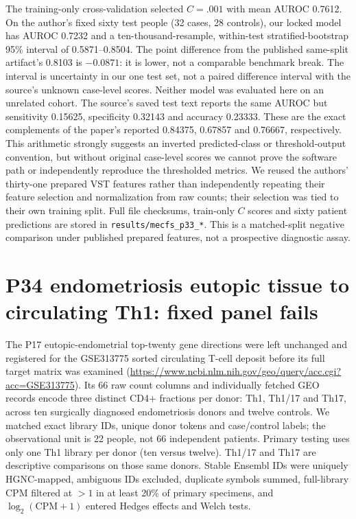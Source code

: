 \documentclass[11pt,a4paper]{article}
\begin{document}
The training-only cross-validation selected $C=.001$ with mean AUROC 0.7612. On the author's fixed sixty test people (32 cases, 28 controls), our locked model has AUROC 0.7232 and a ten-thousand-resample, within-test stratified-bootstrap 95\% interval of 0.5871--0.8504. The point difference from the published same-split artifact's 0.8103 is $-0.0871$: it is lower, not a comparable benchmark break. The interval is uncertainty in our one test set, not a paired difference interval with the source's unknown case-level scores. Neither model was evaluated here on an unrelated cohort. The source's saved test text reports the same AUROC but sensitivity 0.15625, specificity 0.32143 and accuracy 0.23333. These are the exact complements of the paper's reported 0.84375, 0.67857 and 0.76667, respectively. This arithmetic strongly suggests an inverted predicted-class or threshold-output convention, but without original case-level scores we cannot prove the software path or independently reproduce the thresholded metrics. We reused the authors' thirty-one prepared VST features rather than independently repeating their feature selection and normalization from raw counts; their selection was tied to their own training split. Full file checksums, train-only $C$ scores and sixty patient predictions are stored in \texttt{results/mecfs\_p33\_*}. This is a matched-split negative comparison under published prepared features, not a prospective diagnostic assay.

\section{P34 endometriosis eutopic tissue to circulating Th1: fixed panel fails}
The P17 eutopic-endometrial top-twenty gene directions were left unchanged and registered for the GSE313775 sorted circulating T-cell deposit before its full target matrix was examined (\url{https://www.ncbi.nlm.nih.gov/geo/query/acc.cgi?acc=GSE313775}). Its 66 raw count columns and individually fetched GEO records encode three distinct CD4+ fractions per donor: Th1, Th1/17 and Th17, across ten surgically diagnosed endometriosis donors and twelve controls. We matched exact library IDs, unique donor tokens and case/control labels; the observational unit is 22 people, not 66 independent patients. Primary testing uses only one Th1 library per donor (ten versus twelve). Th1/17 and Th17 are descriptive comparisons on those same donors. Stable Ensembl IDs were uniquely HGNC-mapped, ambiguous IDs excluded, duplicate symbols summed, full-library CPM filtered at $>1$ in at least 20\% of primary specimens, and $\log_2(\mathrm{CPM}+1)$ entered Hedges effects and Welch tests.
\end{document}

